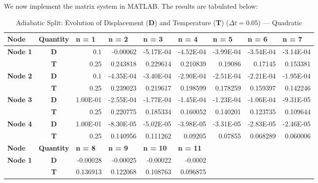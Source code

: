 \newpage We now implement the matrix system in MATLAB. The results are tabulated below: 
\begin{table}[htbp]
  \centering
  \caption{Adiabatic Split: Evolution of Displacement ({\bf D}) and Temperature ({\bf T}) ($\Delta t = 0.05$) --- Quadratic}
    \begin{tabular}{rcrrrrrrr}
    \toprule
    \multicolumn{1}{l}{\textbf{Node}} & \multicolumn{1}{l}{\textbf{Quantity}} & \multicolumn{1}{l}{\textbf{n = 1}} & \multicolumn{1}{l}{\textbf{n = 2}} & \multicolumn{1}{l}{\textbf{n = 3}} & \multicolumn{1}{l}{\textbf{n = 4}} & \multicolumn{1}{l}{\textbf{n = 5}} & \multicolumn{1}{l}{\textbf{n = 6}} & \multicolumn{1}{l}{\textbf{n = 7}} \\
    \midrule
    \multicolumn{1}{l}{\textbf{Node 1}} & \textbf{D} & 0.1   & -0.00062 & -5.17E-04 & -4.52E-04 & -3.99E-04 & -3.54E-04 & -3.14E-04 \\
          & \textbf{T} & 0.25  & 0.243818 & 0.229614 & 0.210839 & 0.19086 & 0.17145 & 0.153381 \\
    \multicolumn{1}{l}{\textbf{Node 2}} & \textbf{D} & 0.1   & -4.35E-04 & -3.40E-04 & -2.90E-04 & -2.51E-04 & -2.21E-04 & -1.95E-04 \\
          & \textbf{T} & 0.25  & 0.239023 & 0.219617 & 0.198599 & 0.178259 & 0.159397 & 0.142246 \\
    \multicolumn{1}{l}{\textbf{Node 3}} & \textbf{D} & 1.00E-01 & -2.55E-04 & -1.77E-04 & -1.45E-04 & -1.23E-04 & -1.06E-04 & -9.31E-05 \\
          & \textbf{T} & 0.25  & 0.220775 & 0.185334 & 0.160052 & 0.140201 & 0.123735 & 0.109644 \\
    \multicolumn{1}{l}{\textbf{Node 4}} & \textbf{D} & 1.00E-01 & -8.30E-05 & -5.02E-05 & -3.98E-05 & -3.31E-05 & -2.83E-05 & -2.46E-05 \\
          & \textbf{T} & 0.25  & 0.140956 & 0.111262 & 0.09205 & 0.07855 & 0.068289 & 0.060006 \\
    \midrule
    \multicolumn{1}{l}{\textbf{Node}} & \multicolumn{1}{l}{\textbf{Quantity}} & \multicolumn{1}{l}{\textbf{n = 8}} & \multicolumn{1}{l}{\textbf{n = 9}} & \multicolumn{1}{l}{\textbf{n = 10}} & \multicolumn{1}{l}{\textbf{n = 11}} &       &       &  \\
\cmidrule{1-6}    \multicolumn{1}{l}{\textbf{Node 1}} & \textbf{D} & -0.00028 & -0.00025 & -0.00022 & -0.0002 &       &       &  \\
          & \textbf{T} & 0.136913 & 0.122068 & 0.108763 & 0.096875 &       &       &  \\

\end{tabular}
\end{table}
